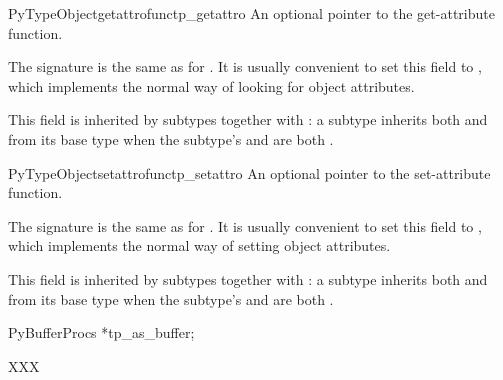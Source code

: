 \begin{cmemberdesc}{PyTypeObject}{getattrofunc}{tp_getattro}
  An optional pointer to the get-attribute function.

  The signature is the same as for .  It
  is usually convenient to set this field to
  , which implements the normal
  way of looking for object attributes.

  This field is inherited by subtypes together with
  : a subtype inherits both  and
   from its base type when the subtype's
   and  are both \NULL.
\end{cmemberdesc}

\begin{cmemberdesc}{PyTypeObject}{setattrofunc}{tp_setattro}
  An optional pointer to the set-attribute function.

  The signature is the same as for .  It
  is usually convenient to set this field to
  , which implements the normal
  way of setting object attributes.

  This field is inherited by subtypes together with
  : a subtype inherits both  and
   from its base type when the subtype's
   and  are both \NULL.
\end{cmemberdesc}

PyBufferProcs *tp_as_buffer;

    XXX


